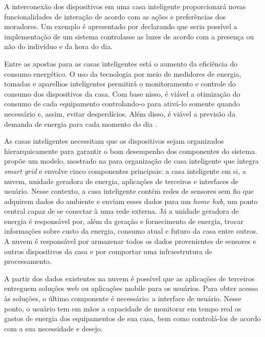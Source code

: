 A interconexão dos dispositivos em uma casa inteligente proporcionará novas funcionalidades de interação de acordo com as ações e preferências dos moradores. Um exemplo é apresentado por  declarando que seria possível a implementação de um sistema controlasse as luzes de acordo com a presença ou não do indivíduo e da hora do dia.

Entre as apostas para as casas inteligentes está o aumento da eficiência do consumo energético. O uso da tecnologia por meio de medidores de energia, tomadas e aparelhos inteligentes permitirá o monitoramento e controle do consumo dos dispositivos da casa. Com base nisso, é viável a otimização do consumo de cada equipamento controlando-o para ativá-lo somente quando necessário e, assim, evitar desperdícios. Além disso, é viável a previsão da demanda de energia para cada momento do dia \cite{Stojkoska2017}.

As casas inteligentes necessitam que os dispositivos sejam organizados hierarquicamente para garantir o bom desempenho dos componentes do sistema.  propõe um modelo, mostrado na  para organização de casa inteligente que integra \textit{smart grid} e envolve cinco componentes principais: a casa inteligente em si, a nuvem, unidade geradora de energia, aplicações de terceiros e interfaces de usuário. Nesse contexto, a casa inteligente contém redes de sensores sem fio que adquirem dados do ambiente e enviam esses dados para um \textit{home hub}, um ponto central capaz de se conectar à uma rede externa. Já a unidade geradora de energia é responsável por, além da geração e fornecimento de energia, trocar informações sobre custo da energia, consumo atual e futuro da casa entre outros. 
A nuvem é responsável por armazenar todos os dados provenientes de sensores e outros dispositivos da casa e por comportar uma infraestrutura de processamento. 

A partir dos dados existentes na nuvem é possível que as aplicações de terceiros entreguem soluções web ou aplicações mobile para os usuários. Para obter acesso às soluções, o último componente é necessário: a interface de usuário. Nesse ponto, o usuário tem em mãos a capacidade de monitorar em tempo real os gastos de energia dos equipamentos de sua casa, bem como controlá-los de acordo com a sua necessidade e desejo.


